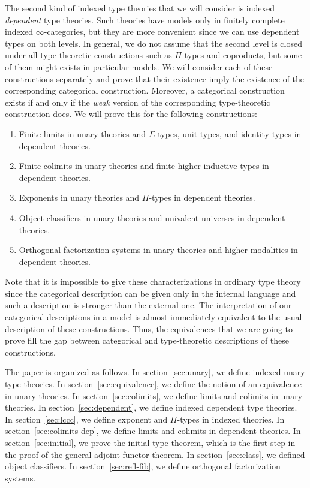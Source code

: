 \documentclass[reqno]{mscs}
\numberwithin{figure}{section}
\begin{document}
The second kind of indexed type theories that we will consider is indexed \emph{dependent} type theories.
Such theories have models only in finitely complete indexed $\infty$-categories, but they are more convenient since we can use dependent types on both levels.
In general, we do not assume that the second level is closed under all type-theoretic constructions such as $\Pi$-types and coproducts, but some of them might exists in particular models.
We will consider each of these constructions separately and prove that their existence imply the existence of the corresponding categorical construction.
Moreover, a categorical construction exists if and only if the \emph{weak} version of the corresponding type-theoretic construction does.
We will prove this for the following constructions:
\begin{enumerate}
\item Finite limits in unary theories and $\Sigma$-types, unit types, and identity types in dependent theories.
\item Finite colimits in unary theories and finite higher inductive types in dependent theories.
\item Exponents in unary theories and $\Pi$-types in dependent theories.
\item Object classifiers in unary theories and univalent universes in dependent theories.
\item Orthogonal factorization systems in unary theories and higher modalities in dependent theories.
\end{enumerate}
Note that it is impossible to give these characterizations in ordinary type theory since the categorical description can be given only in the internal language and such a description is stronger than the external one.
The interpretation of our categorical descriptions in a model is almost immediately equivalent to the usual description of these constructions.
Thus, the equivalences that we are going to prove fill the gap between categorical and type-theoretic descriptions of these constructions.

The paper is organized as follows.
In section~\ref{sec:unary}, we define indexed unary type theories.
In section~\ref{sec:equivalence}, we define the notion of an equivalence in unary theories.
In section~\ref{sec:colimits}, we define limits and colimits in unary theories.
In section~\ref{sec:dependent}, we define indexed dependent type theories.
In section~\ref{sec:lccc}, we define exponent and $\Pi$-types in indexed theories.
In section~\ref{sec:colimits-dep}, we define limits and colimits in dependent theories.
In section~\ref{sec:initial}, we prove the initial type theorem, which is the first step in the proof of the general adjoint functor theorem.
In section~\ref{sec:class}, we defined object classifiers.
In section~\ref{sec:refl-fib}, we define orthogonal factorization systems.
\end{document}
